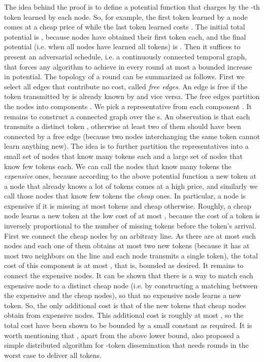 \documentclass[oribibl, 11pt]{llncs}
\begin{document}
The idea behind the proof is to define a potential function that charges by  the -th token learned by each node. So, for example, the first token learned by a node comes at a cheap price of  while the last token learned costs . The initial total potential is , because  nodes have obtained their first token each, and the final potential (i.e. when all nodes have learned all  tokens) is . Then it suffices to present an adversarial schedule, i.e. a continuously connected temporal graph, that forces any algorithm to achieve in every round at most a bounded increase in potential. The topology of a round can be summarized as follows. First we select all edges that contribute no cost, called \emph{free edges}. An edge  is free if the token transmitted by  is already known by  and vice versa. The free edges partition the nodes into  components . We pick a representative  from each component . It remains to construct a connected graph over the s. An observation is that each  transmits a distinct token , otherwise at least two of them should have been connected by a free edge (because two nodes interchanging the same token cannot learn anything new). The idea is to further partition the representatives into a small set of nodes that know many tokens each and a large set of nodes that know few tokens each. We can call the nodes that know many tokens the \emph{expensive} ones, because according to the above potential function a new token at a node that already knows a lot of tokens comes at a high price, and similarly we call those nodes that know few tokens the \emph{cheap} ones. In particular, a node is expensive if it is missing at most  tokens and cheap otherwise. Roughly, a cheap node learns a new token at the low cost of at most , because the cost of a token is inversely proportional to the number of missing tokens before the token's arrival. First we connect the cheap nodes by an arbitrary line. As there are at most  such nodes and each one of them obtains at most two new tokens (because it has at most two neighbors on the line and each node transmits a single token), the total cost of this component is at most , that is, bounded as desired. It remains to connect the expensive nodes. It can be shown that there is a way to match each expensive node to a distinct cheap node (i.e. by constructing a matching between the expensive and the cheap nodes), so that no expensive node learns a new token. So, the only additional cost is that of the new tokens that cheap nodes obtain from expensive nodes. This additional cost is roughly at most , so the total cost have been shown to be bounded by a small constant as required. It is worth mentioning that \cite{KLO10}, apart from the above lower bound, also proposed a simple distributed algorithm for -token dissemination that needs  rounds in the worst case to deliver all tokens.
\end{document}
